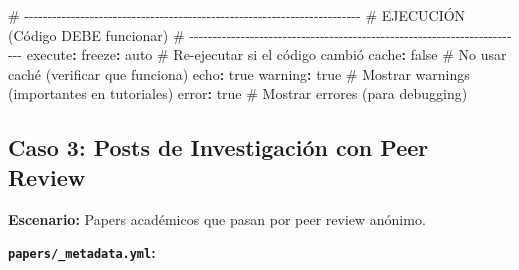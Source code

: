 \documentclass[
  doc,
  floatsintext,
  longtable,
  a4paper,
  nolmodern,
  notxfonts,
  notimes,
  12pt,
  colorlinks=true,linkcolor=blue,citecolor=blue,urlcolor=blue]{apa7}
\newenvironment{Shaded}{\begin{snugshade}}{\end{snugshade}}
\newcommand{\AttributeTok}[1]{\textcolor[rgb]{0.40,0.45,0.13}{#1}}
\newcommand{\CharTok}[1]{\textcolor[rgb]{0.13,0.47,0.30}{#1}}
\newcommand{\CommentTok}[1]{\textcolor[rgb]{0.37,0.37,0.37}{#1}}
\newcommand{\FunctionTok}[1]{\textcolor[rgb]{0.28,0.35,0.67}{#1}}
\newcommand{\KeywordTok}[1]{\textcolor[rgb]{0.00,0.23,0.31}{\textbf{#1}}}
\begin{document}
\begin{Shaded}
\begin{Highlighting}[]
\CommentTok{\# {-}{-}{-}{-}{-}{-}{-}{-}{-}{-}{-}{-}{-}{-}{-}{-}{-}{-}{-}{-}{-}{-}{-}{-}{-}{-}{-}{-}{-}{-}{-}{-}{-}{-}{-}{-}{-}{-}{-}{-}{-}{-}{-}{-}{-}{-}{-}{-}{-}{-}{-}{-}{-}{-}{-}{-}{-}{-}{-}{-}{-}{-}{-}{-}{-}{-}{-}{-}{-}{-}{-}{-}}
\CommentTok{\# EJECUCIÓN (Código DEBE funcionar)}
\CommentTok{\# {-}{-}{-}{-}{-}{-}{-}{-}{-}{-}{-}{-}{-}{-}{-}{-}{-}{-}{-}{-}{-}{-}{-}{-}{-}{-}{-}{-}{-}{-}{-}{-}{-}{-}{-}{-}{-}{-}{-}{-}{-}{-}{-}{-}{-}{-}{-}{-}{-}{-}{-}{-}{-}{-}{-}{-}{-}{-}{-}{-}{-}{-}{-}{-}{-}{-}{-}{-}{-}{-}{-}{-}}
\FunctionTok{execute}\KeywordTok{:}
\AttributeTok{  }\FunctionTok{freeze}\KeywordTok{:}\AttributeTok{ auto}\CommentTok{              \# Re{-}ejecutar si el código cambió}
\AttributeTok{  }\FunctionTok{cache}\KeywordTok{:}\AttributeTok{ }\CharTok{false}\CommentTok{              \# No usar caché (verificar que funciona)}
\AttributeTok{  }\FunctionTok{echo}\KeywordTok{:}\AttributeTok{ }\CharTok{true}
\AttributeTok{  }\FunctionTok{warning}\KeywordTok{:}\AttributeTok{ }\CharTok{true}\CommentTok{             \# Mostrar warnings (importantes en tutoriales)}
\AttributeTok{  }\FunctionTok{error}\KeywordTok{:}\AttributeTok{ }\CharTok{true}\CommentTok{               \# Mostrar errores (para debugging)}
\end{Highlighting}
\end{Shaded}

\subsection{Caso 3: Posts de Investigación con Peer
Review}\label{caso-3-posts-de-investigaciuxf3n-con-peer-review}

\textbf{Escenario:} Papers académicos que pasan por peer review anónimo.

\textbf{\texttt{papers/\_metadata.yml}:}
\end{document}
